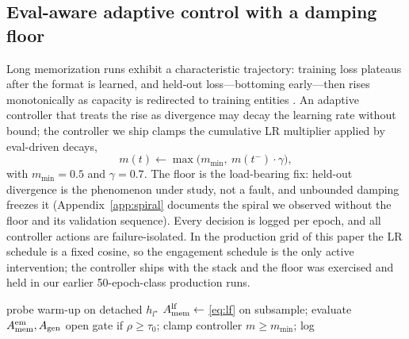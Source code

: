 \subsection{Eval-aware adaptive control with a damping floor}
\label{sec:method:control}

Long memorization runs exhibit a characteristic trajectory: training
loss plateaus after the format is learned, and held-out loss---bottoming
early---then rises monotonically as capacity is redirected to training
entities \citep{tirumala2022memorization}. An adaptive controller that
treats the rise as divergence may decay the learning rate without
bound; the controller we ship clamps the cumulative LR multiplier
applied by eval-driven decays,
\begin{equation}
  m(t) \leftarrow \max\!\bigl(m_{\min},\ m(t^-)\cdot \gamma\bigr),
  \label{eq:floor}
\end{equation}
with $m_{\min}{=}0.5$ and $\gamma{=}0.7$. The floor is the load-bearing
fix: held-out divergence is the phenomenon under study, not a fault,
and unbounded damping freezes it (Appendix~\ref{app:spiral} documents
the spiral we observed without the floor and its validation sequence).
Every decision is logged per epoch, and all controller actions are
failure-isolated. In the production grid of this paper the LR schedule
is a fixed cosine, so the engagement schedule is the only active
intervention; the controller ships with the stack and the floor was
exercised and held in our earlier 50-epoch-class production runs.

\begin{algorithm}[t]
\caption{MLPR training loop (one epoch)}
\label{alg:mlpr}
probe warm-up on detached $h_{l^\star}$\;
$A_{\mathrm{mem}}^{\mathrm{lf}} \leftarrow$ \eqref{eq:lf} on subsample; evaluate
$A_{\mathrm{mem}}^{\mathrm{em}}, A_{\mathrm{gen}}$\;
open gate if $\rho \ge \tau_0$; clamp controller $m \ge m_{\min}$; log\;
\end{algorithm}
